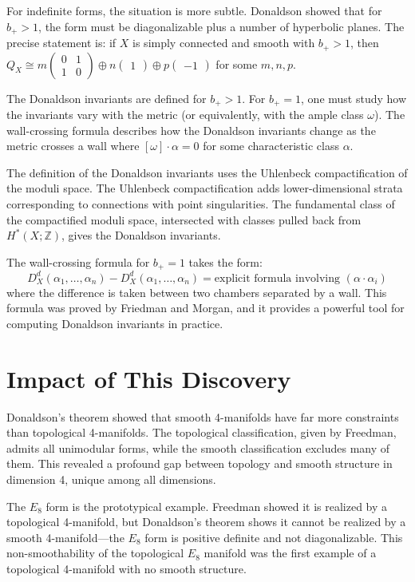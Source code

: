 For indefinite forms, the situation is more subtle. Donaldson showed that for $b_+ > 1$, the form must be diagonalizable plus a number of hyperbolic planes. The precise statement is: if $X$ is simply connected and smooth with $b_+ > 1$, then $Q_X \cong m\begin{pmatrix} 0 & 1 \\ 1 & 0 \end{pmatrix} \oplus n\begin{pmatrix} 1 \end{pmatrix} \oplus p\begin{pmatrix} -1 \end{pmatrix}$ for some $m, n, p$.

The Donaldson invariants are defined for $b_+ > 1$. For $b_+ = 1$, one must study how the invariants vary with the metric (or equivalently, with the ample class $\omega$). The wall-crossing formula describes how the Donaldson invariants change as the metric crosses a wall where $[\omega] \cdot \alpha = 0$ for some characteristic class $\alpha$.

The definition of the Donaldson invariants uses the Uhlenbeck compactification of the moduli space. The Uhlenbeck compactification adds lower-dimensional strata corresponding to connections with point singularities. The fundamental class of the compactified moduli space, intersected with classes pulled back from $H^*(X;\mathbb{Z})$, gives the Donaldson invariants.

The wall-crossing formula for $b_+ = 1$ takes the form:
\[
D_X^d(\alpha_1, \ldots, \alpha_n) - D_X^d(\alpha_1, \ldots, \alpha_n) = \text{explicit formula involving } (\alpha \cdot \alpha_i)
\]
where the difference is taken between two chambers separated by a wall. This formula was proved by Friedman and Morgan, and it provides a powerful tool for computing Donaldson invariants in practice.

\section{Impact of This Discovery}

Donaldson's theorem showed that smooth 4-manifolds have far more constraints than topological 4-manifolds. The topological classification, given by Freedman, admits all unimodular forms, while the smooth classification excludes many of them. This revealed a profound gap between topology and smooth structure in dimension 4, unique among all dimensions.

The $E_8$ form is the prototypical example. Freedman showed it is realized by a topological 4-manifold, but Donaldson's theorem shows it cannot be realized by a smooth 4-manifold---the $E_8$ form is positive definite and not diagonalizable. This non-smoothability of the topological $E_8$ manifold was the first example of a topological 4-manifold with no smooth structure.

